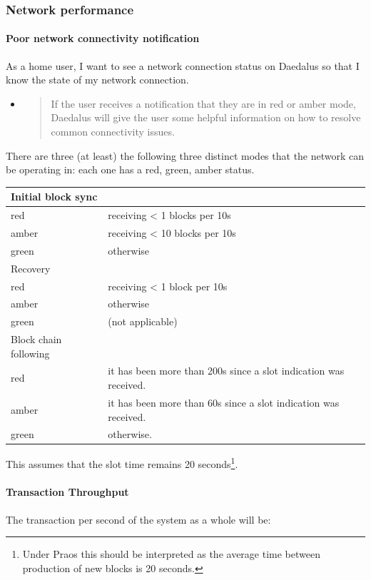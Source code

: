\documentclass[11pt,a4paper]{article}
\begin{document}
\subsubsection{Network performance}
\label{network-performance}

\paragraph{Poor network connectivity notification}

As a home user, I want to see a network connection status on Daedalus so
that I know the state of my network connection.

\begin{itemize}
\item
  \begin{quote}
  If the user receives a notification that they are in red or amber
  mode, Daedalus will give the user some helpful information on how to
  resolve common connectivity issues.
  \end{quote}
\end{itemize}

There are three (at least) the following three distinct modes that the
network can be operating in: each one has a red, green, amber status.

\begin{longtable}[]{@{}ll@{}}
\toprule
Initial block sync &\tabularnewline
\midrule
\endhead
red & receiving \textless{} 1 blocks per 10s\tabularnewline
amber & receiving \textless{} 10 blocks per 10s\tabularnewline
green & otherwise\tabularnewline
Recovery &\tabularnewline
red & receiving \textless{} 1 block per 10s\tabularnewline
amber & otherwise\tabularnewline
green & (not applicable)\tabularnewline
Block chain following &\tabularnewline
red & it has been more than 200s since a slot indication was
received.\tabularnewline
amber & it has been more than 60s since a slot indication was
received.\tabularnewline
green & otherwise.\tabularnewline
\bottomrule
\end{longtable}

This assumes that the slot time remains 20 seconds\footnote{Under Praos
  this should be interpreted as the average time between production of
  new blocks is 20 seconds.}.

\paragraph{Transaction Throughput}

The transaction per second of the system as a whole will be:
\end{document}
